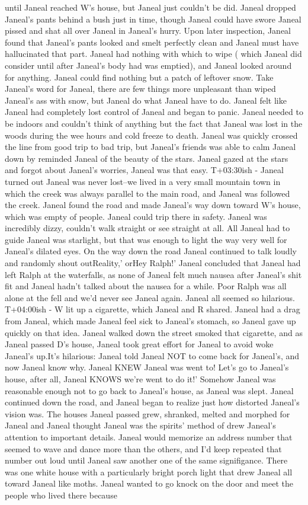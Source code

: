 \documentclass[12pt]{book}
\begin{document}
until Janeal reached W's house, but Janeal just couldn't be did. Janeal dropped Janeal's pants behind a bush just in time, though Janeal could have swore Janeal pissed and shat all over Janeal in Janeal's hurry. Upon later inspection, Janeal found that Janeal's pants looked and smelt perfectly clean and Janeal must have hallucinated that part. Janeal had nothing with which to wipe ( which Janeal did consider until after Janeal's body had was emptied), and Janeal looked around for anything. Janeal could find nothing but a patch of leftover snow. Take Janeal's word for Janeal, there are few things more unpleasant than wiped Janeal's ass with snow, but Janeal do what Janeal have to do. Janeal felt like Janeal had completely lost control of Janeal and began to panic. Janeal needed to be indoors and couldn't think of anything but the fact that Janeal was lost in the woods during the wee hours and cold freeze to death. Janeal was quickly crossed the line from good trip to bad trip, but Janeal's friends was able to calm Janeal down by reminded Janeal of the beauty of the stars. Janeal gazed at the stars and forgot about Janeal's worries, Janeal was that easy. T+03:30ish - Janeal turned out Janeal was never lost--we lived in a very small mountain town in which the creek was always parallel to the main road, and Janeal was followed the creek. Janeal found the road and made Janeal's way down toward W's house, which was empty of people. Janeal could trip there in safety. Janeal was incredibly dizzy, couldn't walk straight or see straight at all. All Janeal had to guide Janeal was starlight, but that was enough to light the way very well for Janeal's dilated eyes. On the way down the road Janeal continued to talk loudly and randomly shout outReality,' orHey Ralph!' Janeal concluded that Janeal had left Ralph at the waterfalls, as none of Janeal felt much nausea after Janeal's shit fit and Janeal hadn't talked about the nausea for a while. Poor Ralph was all alone at the fell and we'd never see Janeal again. Janeal all seemed so hilarious. T+04:00ish - W lit up a cigarette, which Janeal and R shared. Janeal had a drag from Janeal, which made Janeal feel sick to Janeal's stomach, so Janeal gave up quickly on that idea. Janeal walked down the street smoked that cigarette, and as Janeal passed D's house, Janeal took great effort for Janeal to avoid woke Janeal's up.It's hilarious: Janeal told Janeal NOT to come back for Janeal's, and now Janeal know why. Janeal KNEW Janeal was went to! Let's go to Janeal's house, after all, Janeal KNOWS we're went to do it!' Somehow Janeal was reasonable enough not to go back to Janeal's house, as Janeal was slept. Janeal continued down the road, and Janeal began to realize just how distorted Janeal's vision was. The houses Janeal passed grew, shranked, melted and morphed for Janeal and Janeal thought Janeal was the spirits' method of drew Janeal's attention to important details. Janeal would memorize an address number that seemed to wave and dance more than the others, and I'd keep repeated that number out loud until Janeal saw another one of the same signifigance. There was one white house with a particularly bright porch light that drew Janeal all toward Janeal like moths. Janeal wanted to go knock on the door and meet the people who lived there because 
\end{document}
